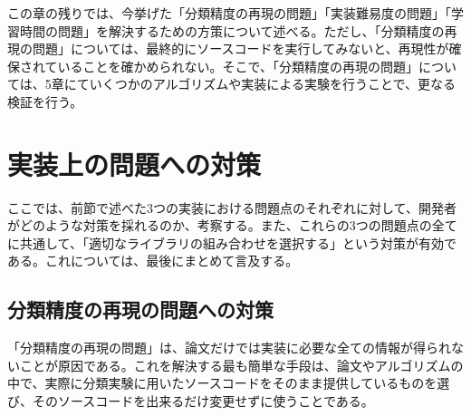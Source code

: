この章の残りでは、今挙げた「分類精度の再現の問題」「実装難易度の問題」「学習時間の問題」を解決するための方策について述べる。ただし、「分類精度の再現の問題」については、最終的にソースコードを実行してみないと、再現性が確保されていることを確かめられない。そこで、「分類精度の再現の問題」については、5章にていくつかのアルゴリズムや実装による実験を行うことで、更なる検証を行う。

\section{実装上の問題への対策}
ここでは、前節で述べた3つの実装における問題点のそれぞれに対して、開発者がどのような対策を採れるのか、考察する。また、これらの3つの問題点の全てに共通して、「適切なライブラリの組み合わせを選択する」という対策が有効である。これについては、最後にまとめて言及する。

\subsection{分類精度の再現の問題への対策}
\label{subsec:c4_provision_replication}
「分類精度の再現の問題」は、論文だけでは実装に必要な全ての情報が得られないことが原因である。これを解決する最も簡単な手段は、論文やアルゴリズムの中で、実際に分類実験に用いたソースコードをそのまま提供しているものを選び、そのソースコードを出来るだけ変更せずに使うことである。


